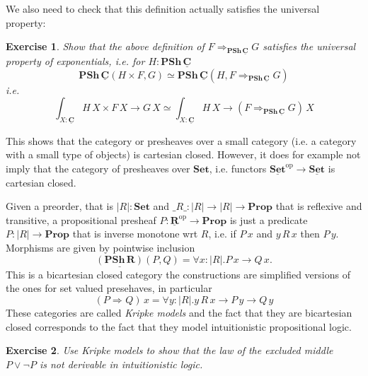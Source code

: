 \documentclass{article}
\newcommand{\Prop}{\mathbf{Prop}}
\newcommand{\Set}{\mathbf{Set}}
\newcommand{\cat}[1]{\underline{\mathbf{#1}}}
\newcommand{\obj}[1]{|#1|}
\newcommand{\homC}[3]{\cat{#1}(#2,#3)}
\newcommand{\op}{\mathrm{op}}
\newcommand{\PSh}{\mathbf{PSh}}
\newcommand{\expC}[3]{#2\Rightarrow_{#1} #3}
\newcommand{\expX}[2]{\expC{}{#1}{#2}}
\newtheorem{exercise}{Exercise}
\begin{document}
We also need to check that this definition actually satisfies the universal property:
\begin{exercise}
  Show that the above definition of $\expC{\PSh\,\cat{C}}{F}{G}$ satisfies the universal property of exponentials, i.e. for $H : \PSh\,\cat{C}$
  \[ \PSh\,\cat{C}(H \times F,G) \simeq \PSh\,\cat{C}(H, \expC{\PSh\,\cat{C}}{F}{G})\]
  i.e.
  \[ \int_{X:\cat{C}}H\,X \times F\,X \to G\,X \simeq
    \int_{X:\cat{C}}H\,X \to (\expC{\PSh\,\cat{C}}{F}{G})\,X\]
\end{exercise}

This shows that the category or presheaves over a small category (i.e. a category with a small type of objects) is cartesian closed. However, it does for example not imply that the category of presheaves over $\Set$, i.e. functors $\cat{\Set}^\op \to \cat{\Set}$ is cartesian closed. 

Given a preorder, that is $|R|:\Set$ and $\_R\_ : |R| \to |R| \to \Prop$ that is reflexive and transitive, a propositional presheaf $P : \cat{R}^\op \to \Prop$ is just a predicate $P : |R| \to \Prop$ that is inverse monotone wrt $R$, i.e. if $P\,x$ and $y\,R\,x$ then $P\,y$. Morphisms are given by pointwise inclusion 
\[\homC{(\PSh\,R)}{P}{Q} = \forall x:|R|.P\,x \to Q\,x.\]
This is a bicartesian closed category the constructions are simplified versions of the ones for set valued presehaves, in particular 
\[(\expX{P}{Q})\,x = \forall y:|R|.y\,R\,x\to P\,y \to Q\,y \]
These categories are called \emph{Kripke models} and the fact that they are bicartesian closed corresponds to the fact that they model intuitionistic propositional logic.
\begin{exercise}
  Use Kripke models to show that the law of the excluded middle $P \vee \neg P$ is not derivable in intuitionistic logic. 
\end{exercise}

\end{document}
